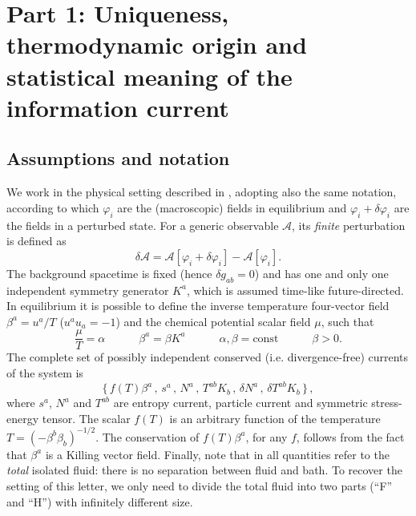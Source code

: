 \documentclass[aps,prl,reprint,nofootinbib]{revtex4-1}
\newcommand{\spc}{\quad \quad \quad}
\begin{document}
\section*{Part 1: Uniqueness, thermodynamic origin and statistical meaning of the information current}

\subsection{Assumptions and notation}

We work in the physical setting described in \cite{GavassinoGibbs2021}, adopting also the same notation, according to which $\varphi_i$ are the (macroscopic) fields in equilibrium and $\varphi_i +\delta \varphi_i$ are the fields in a perturbed state. 
For a generic observable $\mathcal{A}$, its \textit{finite} perturbation is defined as
\begin{equation}
\delta \mathcal{A}=\mathcal{A}[\varphi_i + \delta \varphi_i]-\mathcal{A}[\varphi_i].
\end{equation}
The background spacetime is fixed (hence $\delta g_{ab}=0$) and has one and only one independent symmetry generator $K^a$, which is assumed time-like future-directed. In equilibrium it is possible to define the inverse temperature four-vector field $\beta^a=u^a/T$ ($u^a u_a=-1$) and the chemical potential scalar field $\mu$, such that \cite{Becattini2016Beta}
\begin{equation}\label{alfabeto}
\dfrac{\mu}{T}= \alpha  \spc  \beta^a = \beta K^a  \spc \alpha,\beta = \text{const}  \spc \beta>0.
\end{equation}
The complete set of possibly independent conserved (i.e. divergence-free) currents of the system is 
\begin{equation}\label{BasisCons}
\{ \, f(T) \beta^a  \, , \, s^a \, , \, N^a  \, , \, T^{ab}K_b  \, , \, \delta N^a  \, , \, \delta T^{ab} K_b \, \} \, ,
\end{equation} 
where $s^a$, $N^a$ and $T^{ab}$ are entropy current, particle current and symmetric stress-energy tensor. The scalar $f(T)$ is an arbitrary function of the temperature $T=(-\beta^b \beta_b)^{-1/2}$. The conservation of $f(T) \beta^a$, for any $f$, follows from the fact that $\beta^a$ is a Killing vector field. Finally, note that in \cite{GavassinoGibbs2021} all quantities refer to the \textit{total} isolated fluid: there is no separation between fluid and bath. To recover the setting of this letter, we only need to divide the total fluid into two parts (``F'' and ``H'') with infinitely different size.
\end{document}
